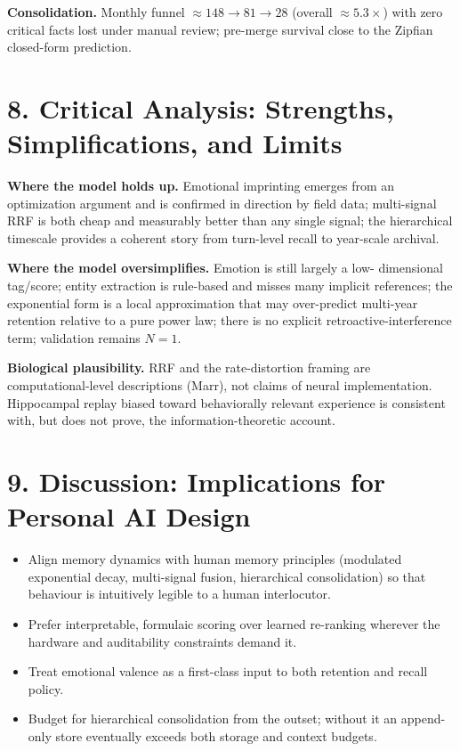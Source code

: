 \documentclass[]{article}
\begin{document}
\textbf{Consolidation.} Monthly funnel \(\approx148\to81\to28\) (overall
\(\approx5.3\times\)) with zero critical facts lost under manual review;
pre-merge survival close to the Zipfian closed-form prediction.

\hypertarget{critical-analysis-strengths-simplifications-and-limits}{%
\section{\texorpdfstring{\textbf{8. Critical Analysis: Strengths,
Simplifications, and
Limits}}{8. Critical Analysis: Strengths, Simplifications, and Limits}}\label{critical-analysis-strengths-simplifications-and-limits}}

\textbf{Where the model holds up.} Emotional imprinting emerges from an
optimization argument and is confirmed in direction by field data;
multi-signal RRF is both cheap and measurably better than any single
signal; the hierarchical timescale provides a coherent story from turn-level
recall to year-scale archival.

\textbf{Where the model oversimplifies.} Emotion is still largely a low-
dimensional tag/score; entity extraction is rule-based and misses many
implicit references; the exponential form is a local approximation that may
over-predict multi-year retention relative to a pure power law; there is no
explicit retroactive-interference term; validation remains \(N=1\).

\textbf{Biological plausibility.} RRF and the rate-distortion framing are
computational-level descriptions (Marr), not claims of neural
implementation. Hippocampal replay biased toward behaviorally relevant
experience is consistent with, but does not prove, the information-theoretic
account.

\hypertarget{discussion-implications-for-personal-ai-design}{%
\section{\texorpdfstring{\textbf{9. Discussion: Implications for
Personal AI
Design}}{9. Discussion: Implications for Personal AI Design}}\label{discussion-implications-for-personal-ai-design}}

\begin{itemize}
\item Align memory dynamics with human memory principles (modulated
  exponential decay, multi-signal fusion, hierarchical consolidation)
  so that behaviour is intuitively legible to a human interlocutor.
\item Prefer interpretable, formulaic scoring over learned re-ranking
  wherever the hardware and auditability constraints demand it.
\item Treat emotional valence as a first-class input to both retention
  and recall policy.
\item Budget for hierarchical consolidation from the outset; without it an
  append-only store eventually exceeds both storage and context budgets.
\end{itemize}
\end{document}
